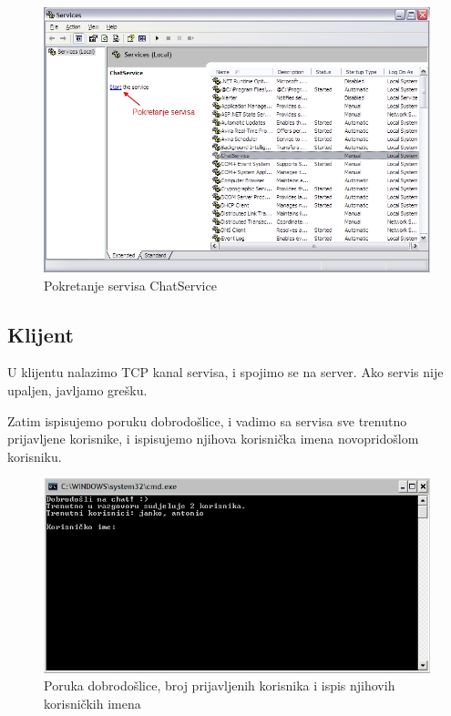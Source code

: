 \documentclass[10pt,a4paper,onecolumn,titlepage]{article}
\begin{document}
\begin{figure}[!ht]
\begin{minipage}{\textwidth}
\centering
\includegraphics[width=\textwidth]{images/start_service.jpg}
\caption{Pokretanje servisa ChatService}
\end{minipage}
\end{figure}

\subsection{Klijent}

U klijentu nalazimo TCP kanal servisa, i spojimo se na server. Ako servis
nije upaljen, javljamo grešku.

Zatim ispisujemo poruku dobrodošlice, i vadimo sa servisa sve trenutno prijavljene
korisnike, i ispisujemo njihova korisnička imena novopridošlom korisniku. 

\begin{figure}[!ht]
\begin{minipage}{\textwidth}
\centering
\includegraphics[width=\textwidth]{images/welcome.jpg}
\caption{Poruka dobrodošlice, broj prijavljenih korisnika i ispis njihovih korisničkih imena}
\end{minipage}
\end{figure}
\end{document}
